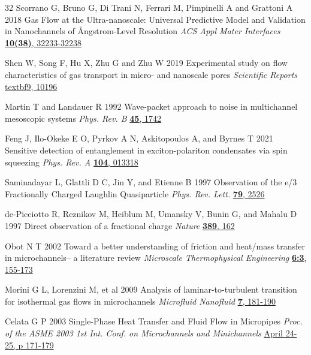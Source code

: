 \documentclass[%
 reprint,
 aps,
 prb,
 epsf,
]{revtex4-2}
\begin{document}
\begin{thebibliography}{32}
 Scorrano G, Bruno G, Di Trani N, Ferrari M, Pimpinelli A and Grattoni A 2018 Gas Flow at the Ultra-nanoscale: Universal Predictive Model and Validation in Nanochannels of Ångstrom-Level Resolution \textit{ACS Appl Mater Interfaces} \href{https://doi.org/10.1021/acsami.8b11455}{\textbf{10(38)}, 32233-32238}

 Shen W, Song F, Hu X, Zhu G and Zhu W 2019 Experimental study on flow characteristics of gas transport in micro- and nanoscale pores \textit{Scientific Reports} \href{https://doi.org/10.1038/s41598-019-46430-2}{textbf{9}, 10196}

 Martin T and Landauer R 1992 Wave-packet approach to noise in multichannel mesoscopic systems \textit{Phys. Rev. B } \href {https://doi.org/10.1103/PhysRevB.45.1742} { \textbf{45}, 1742}

 Feng J, Ilo-Okeke E O, Pyrkov A N, Askitopoulos A, and Byrnes T 2021 Sensitive detection of entanglement in exciton-polariton condensates via spin squeezing \textit{Phys. Rev. A }\href {https://doi.org/10.1103/PhysRevA.104.013318}{\textbf{104}, 013318}

 Saminadayar L, Glattli D C, Jin Y, and Etienne B 1997 Observation of the e/3 Fractionally Charged Laughlin Quasiparticle \textit{Phys. Rev. Lett. } \href {https://doi.org/10.1103/PhysRevLett.79.2526} {\textbf{79}, 2526}

 de-Picciotto R, Reznikov M, Heiblum M, Umansky V, Bunin G, and Mahalu D 1997 Direct observation of a fractional charge \textit{Nature } \href {https://doi.org/10.1038/38241} {\textbf{389}, 162}

	
 Obot N T 2002 Toward a better understanding of friction and heat/mass transfer in microchannels-- a literature review \textit{Microscale Thermophysical Engineering }  \href{https://doi.org/10.1080/10893950290053295}{\textbf{6:3}, 155-173}

 Morini G L, Lorenzini M, et al 2009 Analysis of laminar-to-turbulent transition for isothermal gas flows in microchannels \textit{Microfluid Nanofluid } \href{https://doi.org/10.1007/s10404-008-0369-2} {\textbf{7}, 181-190}

 Celata G P 2003 Single-Phase Heat Transfer and Fluid Flow in Micropipes \textit{Proc. of the ASME 2003 1st Int. Conf. on Microchannels and Minichannels } \href{https://doi.org/10.1115/ICMM2003-1019} {April 24-25, p 171-179}


\end{thebibliography}
\end{document}
